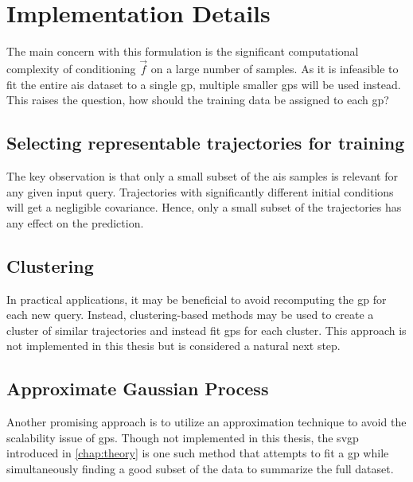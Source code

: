 \section{Implementation Details}

The main concern with this formulation is the significant computational complexity of conditioning $\vec{f}$ on a large number of samples. As it is infeasible to fit the entire \acrshort{ais} dataset to a single \acrshort{gp}, multiple smaller \acrshort{gp}s will be used instead. This raises the question, how should the training data be assigned to each \acrshort{gp}?

\subsection{Selecting representable trajectories for training}
The key observation is that only a small subset of the \acrshort{ais} samples is relevant for any given input query. Trajectories with significantly different initial conditions will get a negligible covariance. Hence, only a small subset of the trajectories has any effect on the prediction. 

\subsection{Clustering}
In practical applications, it may be beneficial to avoid recomputing the \acrshort{gp} for each new query. Instead, clustering-based methods may be used to create a cluster of similar trajectories and instead fit \acrshort{gp}s for each cluster. This approach is not implemented in this thesis but is considered a natural next step.


\subsection{Approximate Gaussian Process}
Another promising approach is to utilize an approximation technique to avoid the scalability issue of \acrshort{gp}s. Though not implemented in this thesis, the \acrshort{svgp} introduced in \cref{chap:theory} is one such method that attempts to fit a \acrshort{gp} while simultaneously finding a good subset of the data to summarize the full dataset.

